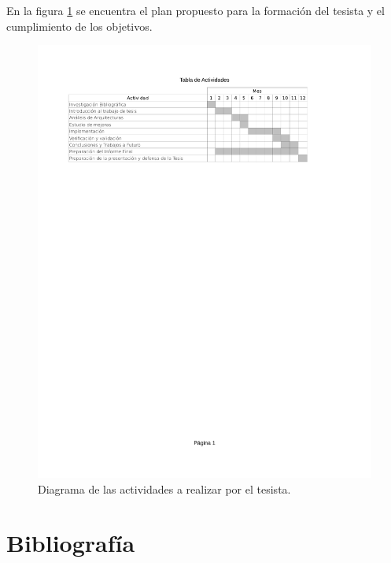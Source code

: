 \documentclass[a4paper]{article}
\begin{document}
En la figura \ref{TablaActividades} se encuentra el plan propuesto para la formación del tesista y el cumplimiento de los objetivos.

\begin{figure}[h!]
   \label{TablaActividades}
   \includegraphics[trim = 20mm 200mm 20mm 25mm, clip, width=\textwidth]{tabla_actividades}
   \caption{Diagrama de las actividades a realizar por el tesista.}
\end{figure}

\newpage

\section{Bibliografía}
\end{document}
